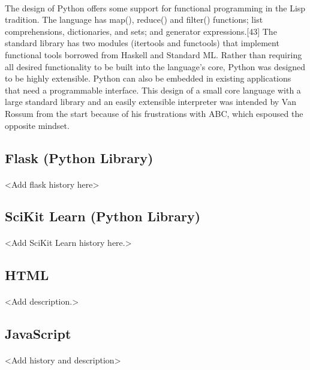 \paragraph{}
The design of Python offers some support for functional programming in the Lisp tradition. The language has map(), reduce() and filter() functions; list comprehensions, dictionaries, and sets; and generator expressions.[43] The standard library has two modules (itertools and functools) that implement functional tools borrowed from Haskell and Standard ML. Rather than requiring all desired functionality to be built into the language's core, Python was designed to be highly extensible. Python can also be embedded in existing applications that need a programmable interface. This design of a small core language with a large standard library and an easily extensible interpreter was intended by Van Rossum from the start because of his frustrations with ABC, which espoused the opposite mindset.

\subsection{Flask (Python Library)}
\paragraph{}
<Add flask history here>

\subsection{SciKit Learn (Python Library)}
\paragraph{}
<Add SciKit Learn history here.>

\subsection{HTML}
\paragraph{}
<Add description.>

\subsection{JavaScript}
\paragraph{}
<Add history and description>

